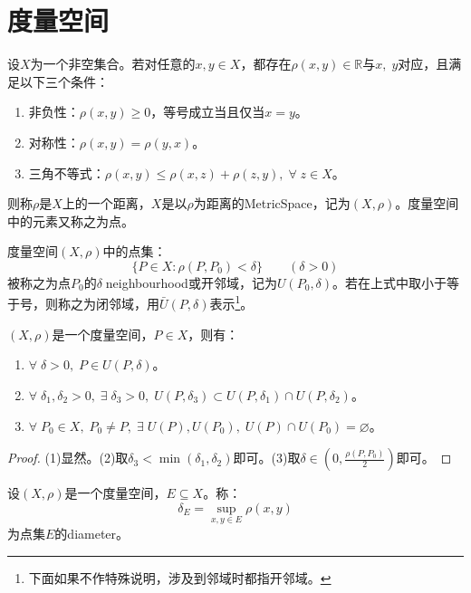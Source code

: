 \chapter{度量空间}

\begin{definition}
	设$X$为一个非空集合。若对任意的$x,y\in X$，都存在$\rho(x,y)\in\mathbb{R}$与$x,\;y$对应，且满足以下三个条件：
	\begin{enumerate}
		\item 非负性：$\rho(x,y)\geqslant0$，等号成立当且仅当$x=y$。
		\item 对称性：$\rho(x,y)=\rho(y,x)$。
		\item 三角不等式：$\rho(x,y)\leqslant\rho(x,z)+\rho(z,y),\;\forall\;z\in X$。
	\end{enumerate}
	则称$\rho$是$X$上的一个距离，$X$是以$\rho$为距离的\gls{MetricSpace}，记为$(X,\rho)$。度量空间中的元素又称之为点。
\end{definition}
\begin{definition}
	度量空间$(X,\rho)$中的点集：
	\begin{equation*}
		\{P\in X:\rho(P,P_0)<\delta\}\qquad (\delta>0)
	\end{equation*}
	被称之为点$P_0$的$\delta\;$\gls{neighbourhood}或开邻域，记为$U(P_0,\delta)$。若在上式中取小于等于号，则称之为闭邻域，用$\bar{U}(P,\delta)$表示\footnote{下面如果不作特殊说明，涉及到邻域时都指开邻域。}。
\end{definition}
\begin{property}
	$(X,\rho)$是一个度量空间，$P\in X$，则有：
	\begin{enumerate}
		\item $\forall\;\delta>0,\;P\in U(P,\delta)$。
		\item $\forall\;\delta_1,\delta_2>0,\;\exists\;\delta_3>0,\;U(P,\delta_3)\subset U(P,\delta_1)\cap U(P,\delta_2)$。
		\item $\forall\;P_0\in X,\;P_0\ne P,\;\exists\;U(P),U(P_0),\;U(P)\cap U(P_0)=\varnothing$。
	\end{enumerate}
\end{property}
\begin{proof}
	(1)显然。(2)取$\delta_3<\min(\delta_1,\delta_2)$即可。(3)取$\delta\in(0,\frac{\rho(P,P_0)}{2})$即可。
\end{proof}
\begin{definition}
	设$(X,\rho)$是一个度量空间，$E\subseteq X$。称：
	\begin{equation*}
		\delta_E=\sup_{x,y\in E}\rho(x,y)
	\end{equation*}
	为点集$E$的\gls{diameter}。
\end{definition}
